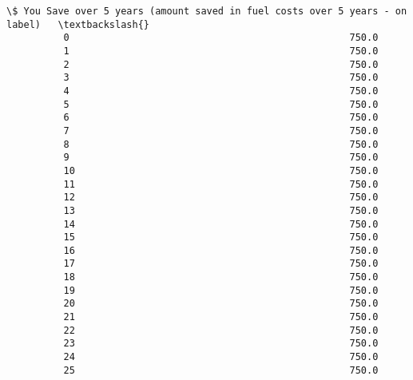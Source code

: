 \documentclass[11pt]{article}
\begin{document}
\begin{Verbatim}[commandchars=\\\{\}]
                \$ You Save over 5 years (amount saved in fuel costs over 5 years - on label)   \textbackslash{}
          0                                                 750.0                               
          1                                                 750.0                               
          2                                                 750.0                               
          3                                                 750.0                               
          4                                                 750.0                               
          5                                                 750.0                               
          6                                                 750.0                               
          7                                                 750.0                               
          8                                                 750.0                               
          9                                                 750.0                               
          10                                                750.0                               
          11                                                750.0                               
          12                                                750.0                               
          13                                                750.0                               
          14                                                750.0                               
          15                                                750.0                               
          16                                                750.0                               
          17                                                750.0                               
          18                                                750.0                               
          19                                                750.0                               
          20                                                750.0                               
          21                                                750.0                               
          22                                                750.0                               
          23                                                750.0                               
          24                                                750.0                               
          25                                                750.0                               

\end{Verbatim}
\end{document}
